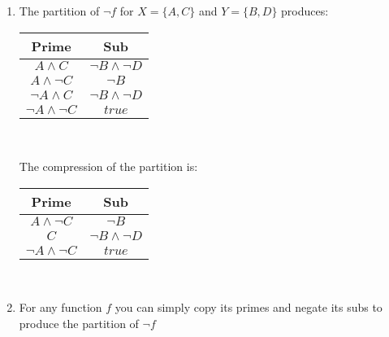 \documentclass{article}
\begin{document}
\begin{enumerate}
\item The partition of $\lnot f$ for $X = \{A,C\}$ and $Y = \{B, D\}$ produces:
\begin{center}
       \begin{tabular}{ |c|c| }
        \hline
         Prime&Sub \\ 
         \hline
         $A \land C$ & $\lnot B \land \lnot D$ \\
         \hline
         $A \land \lnot C$ & $\lnot B$ \\
         \hline
         $\lnot A \land C$ & $\lnot B \land \lnot D$ \\
         \hline
         $\lnot A \land \lnot C$ & $true$ \\
         \hline
        \end{tabular} \\
\end{center}
The compression of the partition is:
\begin{center}
       \begin{tabular}{ |c|c| }
        \hline
         Prime&Sub \\ 
         \hline
         $A \land \lnot C$ & $\lnot B$ \\
         \hline
         $C$ & $\lnot B \land \lnot D$ \\
         \hline
         $\lnot A \land \lnot C$ & $true$ \\
         \hline
        \end{tabular} \\
\end{center}

\item For any function $f$ you can simply copy its primes and negate its subs to produce the partition of $\lnot f$
\end{enumerate}
   
 \clearpage
\end{document}
